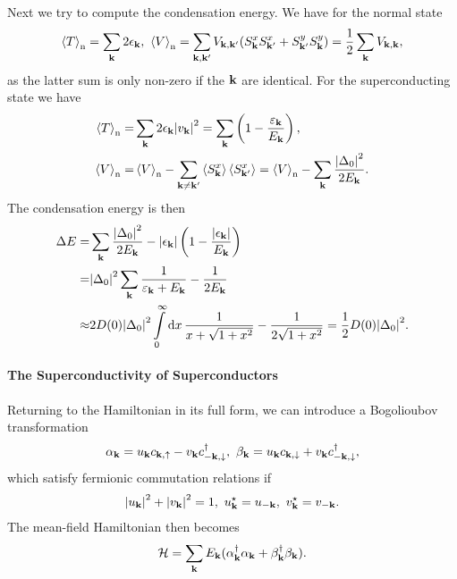 Next we try to compute the condensation energy. We have for the normal state
\begin{align*}
	\expval{T}_{\text{n}} = \sum\limits_{\vb{k}}2\epsilon_{\vb{k}},\ \expval{V}_{\text{n}} = \sum\limits_{\vb{k}, \vb{k}\p}V_{\vb{k}, \vb{k}\p}(S_{\vb{k}}^{x}S_{\vb{k}\p}^{x} + S_{\vb{k}\p}^{y}S_{\vb{k}}^{y}) = \frac{1}{2}\sum\limits_{\vb{k}}V_{\vb{k}, \vb{k}},
\end{align*}
as the latter sum is only non-zero if the $\vb{k}$ are identical. For the superconducting state we have
\begin{align*}
	\expval{T}_{\text{n}} =& \sum\limits_{\vb{k}}2\epsilon_{\vb{k}}\abs{v_{\vb{k}}}^{2} = \sum\limits_{\vb{k}}\left(1 - \frac{\varepsilon_{\vb{k}}}{E_{\vb{k}}}\right), \\
	\expval{V}_{\text{n}} =& \expval{V}_{\text{n}} - \sum\limits_{\vb{k} \neq \vb{k}^{\prime}}\expval{S_{\vb{k}}^{x}}\expval{S_{\vb{k}\ensuremath{^{\prime}}}^{x}} = \expval{V}_{\text{n}} - \sum\limits_{\vb{k}}\frac{\abs{\Delta_{0}}^{2}}{2E_{\vb{k}}}.
\end{align*}
The condensation energy is then
\begin{align*}
	\Delta E =& \sum\limits_{\vb{k}}\frac{\abs{\Delta_{0}}^{2}}{2E_{\vb{k}}} - \abs{\epsilon_{\vb{k}}}\left(1 - \frac{\abs{\epsilon_{\vb{k}}}}{E_{\vb{k}}}\right) \\
	         =& \abs{\Delta_{0}}^{2}\sum\limits_{\vb{k}}\frac{1}{\varepsilon_{\vb{k}} + E_{\vb{k}}} - \frac{1}{2E_{\vb{k}}} \\
	   \approx& 2D(0)\abs{\Delta_{0}}^{2}\int\limits_{0}^{\infty}\dd{x}\frac{1}{x + \sqrt{1 + x^{2}}} - \frac{1}{2\sqrt{1 + x^{2}}} = \frac{1}{2}D(0)\abs{\Delta_{0}}^{2}.
\end{align*}

\paragraph{The Superconductivity of Superconductors}
Returning to the Hamiltonian in its full form, we can introduce a Bogolioubov transformation
\begin{align*}
	\alpha_{\vb{k}} = u_{\vb{k}}c_{\vb{k}, \uparrow} - v_{\vb{k}}c_{-\vb{k}, \downarrow}^{\dagger},\ \beta_{\vb{k}} = u_{\vb{k}}c_{\vb{k}, \downarrow} + v_{\vb{k}}c_{-\vb{k}, \downarrow}^{\dagger},
\end{align*}
which satisfy fermionic commutation relations if
\begin{align*}
	\abs{u_{\vb{k}}}^{2} + \abs{v_{\vb{k}}}^{2} = 1,\ u_{\vb{k}}^{\star} = u_{-\vb{k}},\ v_{\vb{k}}^{\star} = v_{-\vb{k}}.
\end{align*}
The mean-field Hamiltonian then becomes
\begin{align*}
	\mathcal{H} = \sum\limits_{\vb{k}}E_{\vb{k}}(\alpha_{\vb{k}}^{\dagger}\alpha_{\vb{k}} + \beta_{\vb{k}}^{\dagger}\beta_{\vb{k}}).
\end{align*}

